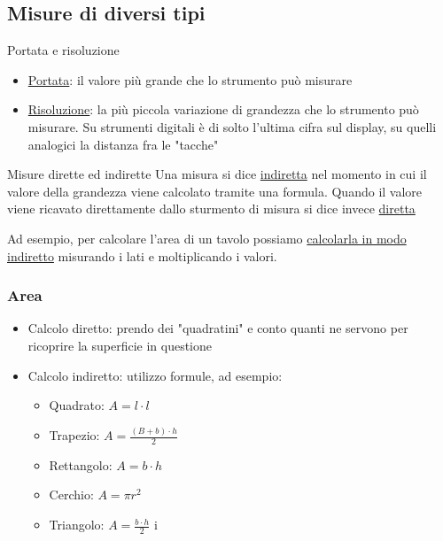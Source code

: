 \subsection{Misure di diversi tipi}
\begin{definizione}{Portata e risoluzione}
	\begin{itemize}
		\item \underline{Portata}: il valore più grande che lo strumento può misurare
		\item \underline{Risoluzione}: la più piccola variazione di grandezza che lo strumento può misurare. Su strumenti digitali è di solto l'ultima cifra sul display, su quelli analogici la distanza fra le "tacche"
	\end{itemize}
\end{definizione}
\begin{definizione}{Misure dirette ed indirette}
	Una misura si dice \underline{indiretta} nel momento in cui il valore della grandezza viene calcolato tramite una formula. Quando il valore viene ricavato direttamente dallo sturmento di misura si dice invece \underline{diretta}
\end{definizione}
Ad esempio, per calcolare l'area di un tavolo possiamo \underline{calcolarla in modo indiretto} misurando i lati e moltiplicando i valori.
\subsubsection{Area}
\begin{itemize}
	\item Calcolo diretto: prendo dei "quadratini" e conto quanti ne servono per ricoprire la superficie in questione
	\item Calcolo indiretto: utilizzo formule, ad esempio:
	      \begin{itemize}
		      \item Quadrato: $ A =l \cdot l $
		      \item Trapezio: $ A = \frac{\left(B + b\right) \cdot h}{2} $
		      \item Rettangolo: $ A = b \cdot h $
		      \item Cerchio: $ A = \pi r^2  $
		      \item Triangolo: $ A = \frac{b\cdot h}{2} $
		            i
	      \end{itemize}
\end{itemize}
